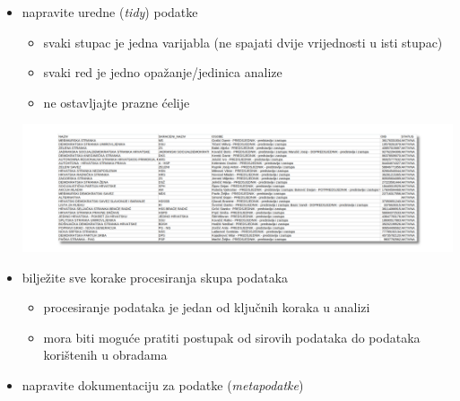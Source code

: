 \documentclass[aspectratio=169]{beamer}
\begin{document}
\begin{frame}
    \begin{itemize}
        \setlength{\itemsep}{2em}

        \item napravite uredne (\textit{tidy}) podatke

        \begin{itemize}
            \item svaki stupac je jedna varijabla (ne spajati dvije vrijednosti
                u isti stupac)

            \item svaki red je jedno opažanje/jedinica analize

            \item ne ostavljajte prazne ćelije

        \end{itemize}

        \pause

        \includegraphics[scale=.28]{images/messy-politics.png}

    \end{itemize}
\end{frame}

\begin{frame}
    \begin{itemize}
        \setlength{\itemsep}{2em}

        \item bilježite sve korake procesiranja skupa podataka

        \pause

        \begin{itemize}
            \item procesiranje podataka je jedan od ključnih koraka u analizi

            \pause

            \item mora biti moguće pratiti postupak od sirovih podataka do
                podataka korištenih u obradama

        \end{itemize}

        \pause

        \item napravite dokumentaciju za podatke (\textit{metapodatke})

    \end{itemize}
\end{frame}
\end{document}
